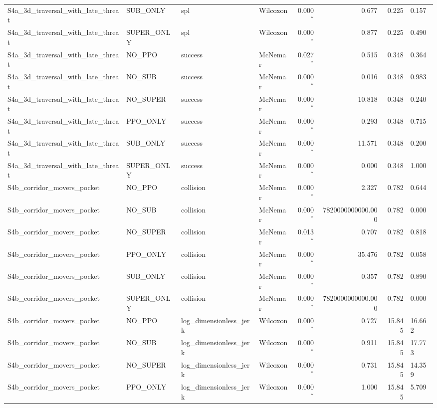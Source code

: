 \begin{tabular}{llllrrrl}
  S4a_3d_traversal_with_late_threat & SUB_ONLY & spl & Wilcoxon & 0.000$^{*}$ & 0.677 & 0.225 & 0.157 \\
  S4a_3d_traversal_with_late_threat & SUPER_ONLY & spl & Wilcoxon & 0.000$^{*}$ & 0.877 & 0.225 & 0.490 \\
  S4a_3d_traversal_with_late_threat & NO_PPO & success & McNemar & 0.027$^{*}$ & 0.515 & 0.348 & 0.364 \\
  S4a_3d_traversal_with_late_threat & NO_SUB & success & McNemar & 0.000$^{*}$ & 0.016 & 0.348 & 0.983 \\
  S4a_3d_traversal_with_late_threat & NO_SUPER & success & McNemar & 0.000$^{*}$ & 10.818 & 0.348 & 0.240 \\
  S4a_3d_traversal_with_late_threat & PPO_ONLY & success & McNemar & 0.000$^{*}$ & 0.293 & 0.348 & 0.715 \\
  S4a_3d_traversal_with_late_threat & SUB_ONLY & success & McNemar & 0.000$^{*}$ & 11.571 & 0.348 & 0.200 \\
  S4a_3d_traversal_with_late_threat & SUPER_ONLY & success & McNemar & 0.000$^{*}$ & 0.000 & 0.348 & 1.000 \\
  S4b_corridor_movers_pocket & NO_PPO & collision & McNemar & 0.000$^{*}$ & 2.327 & 0.782 & 0.644 \\
  S4b_corridor_movers_pocket & NO_SUB & collision & McNemar & 0.000$^{*}$ & 7820000000000.000 & 0.782 & 0.000 \\
  S4b_corridor_movers_pocket & NO_SUPER & collision & McNemar & 0.013$^{*}$ & 0.707 & 0.782 & 0.818 \\
  S4b_corridor_movers_pocket & PPO_ONLY & collision & McNemar & 0.000$^{*}$ & 35.476 & 0.782 & 0.058 \\
  S4b_corridor_movers_pocket & SUB_ONLY & collision & McNemar & 0.000$^{*}$ & 0.357 & 0.782 & 0.890 \\
  S4b_corridor_movers_pocket & SUPER_ONLY & collision & McNemar & 0.000$^{*}$ & 7820000000000.000 & 0.782 & 0.000 \\
  S4b_corridor_movers_pocket & NO_PPO & log_dimensionless_jerk & Wilcoxon & 0.000$^{*}$ & 0.727 & 15.845 & 16.662 \\
  S4b_corridor_movers_pocket & NO_SUB & log_dimensionless_jerk & Wilcoxon & 0.000$^{*}$ & 0.911 & 15.845 & 17.773 \\
  S4b_corridor_movers_pocket & NO_SUPER & log_dimensionless_jerk & Wilcoxon & 0.000$^{*}$ & 0.731 & 15.845 & 14.359 \\
  S4b_corridor_movers_pocket & PPO_ONLY & log_dimensionless_jerk & Wilcoxon & 0.000$^{*}$ & 1.000 & 15.845 & 5.709 \\

\end{tabular}

